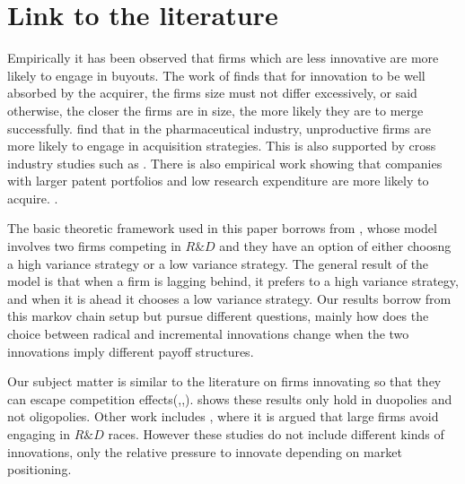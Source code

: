\section{Link to the literature}\label{literature}

Empirically it has been observed that firms which are less innovative are more likely to engage in buyouts. The work of \cite{Gerpott1995} finds that for innovation to be well absorbed by the acquirer, the firms size must not differ excessively, or said otherwise, the closer the firms are in size, the more likely they are to merge successfully. \cite{Higgins2006} find that in the pharmaceutical industry, unproductive firms are more likely to engage in acquisition strategies. This is also supported by cross industry studies such as \cite{Zhao2009}. There is also empirical work showing that companies with larger patent portfolios and low research expenditure are more likely to acquire. \cite{Bena2014}. 




The basic theoretic framework used in this paper borrows from \cite{Cabral2003}, whose model involves two firms competing in $R\&D$ and they have an option of either choosng a high variance strategy or a low variance strategy. The general result of the model is that when a firm is lagging behind, it prefers to a high variance strategy, and when it is ahead it chooses a low variance strategy. Our results borrow from this markov chain setup but pursue different questions, mainly how does the choice between radical and incremental innovations change when the two innovations imply different payoff structures.

Our subject matter is similar to the literature on firms innovating so that they can escape competition effects(\cite{Aghion2005},\cite{Aghion2001},\cite{Aghion1997}). \cite{Gilbert2016} shows these results only hold in duopolies and not oligopolies. Other work includes \cite{Phillips2012}, where it is argued that large firms avoid engaging in $R\&D$ races. However these studies do not include different kinds of innovations, only the relative pressure to innovate depending on market positioning. 

